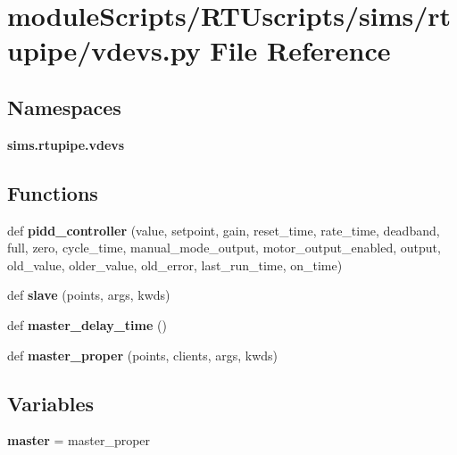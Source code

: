 \section{module\+Scripts/\+R\+T\+Uscripts/sims/rtupipe/vdevs.py File Reference}
\label{rtupipe_2vdevs_8py}
\subsection*{Namespaces}
\begin{DoxyCompactItemize}
\item 
 {\bf sims.\+rtupipe.\+vdevs}
\end{DoxyCompactItemize}
\subsection*{Functions}
\begin{DoxyCompactItemize}
\item 
def {\bf pidd\+\_\+controller} (value, setpoint, gain, reset\+\_\+time, rate\+\_\+time, deadband, full, zero, cycle\+\_\+time, manual\+\_\+mode\+\_\+output, motor\+\_\+output\+\_\+enabled, output, old\+\_\+value, older\+\_\+value, old\+\_\+error, last\+\_\+run\+\_\+time, on\+\_\+time)
\item 
def {\bf slave} (points, args, kwds)
\item 
def {\bf master\+\_\+delay\+\_\+time} ()
\item 
def {\bf master\+\_\+proper} (points, clients, args, kwds)
\end{DoxyCompactItemize}
\subsection*{Variables}
\begin{DoxyCompactItemize}
\item 
{\bf master} = master\+\_\+proper
\end{DoxyCompactItemize}
